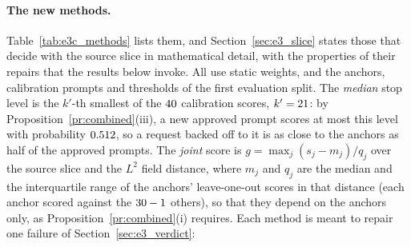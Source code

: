 \documentclass{article}
\theoremstyle{plain}
\theoremstyle{remark}
\begin{document}
\paragraph{The new methods.}
Table~\ref{tab:e3c_methods} lists them, and Section~\ref{sec:e3_slice} states those that decide with the source slice in mathematical
detail, with the properties of their repairs that the results below invoke. All use static weights, and the anchors, calibration prompts and thresholds of the first
evaluation split. The \emph{median} stop level is the $k'$-th smallest of the $40$ calibration scores, $k'=21$: by
Proposition~\ref{pr:combined}(iii), a new approved prompt scores at most this level with probability $0.512$, so a request
backed off to it is as close to the anchors as half of the approved prompts. The \emph{joint} score is
$g=\max_j(s_j-m_j)/q_j$ over the source slice and the $L^2$ field distance, where $m_j$ and $q_j$ are the median and the
interquartile range of the anchors' leave-one-out scores in that distance (each anchor scored against the $30-1$ others), so that
they depend on the anchors only, as Proposition~\ref{pr:combined}(i) requires. Each method is meant to repair one failure of
Section~\ref{sec:e3_verdict}:
\end{document}
